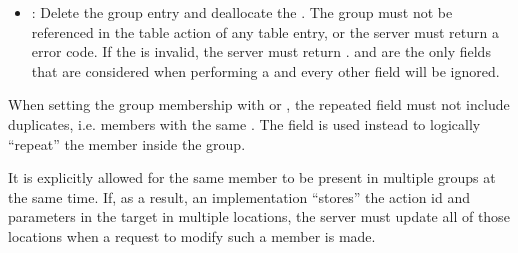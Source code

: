 \documentclass[11pt]{article}
\begin{document}
{\begin{itemize}[noitemsep,topsep=\mdcompacttopsep]
\item{}: Delete the group entry and deallocate the . The group must
not be referenced in the table action of any table entry, or the server must
return a  error code. If the  is invalid, the
server must return .  and  are the
only fields that are considered when performing a  and every other
field will be ignored.%
\end{itemize}%

\noindent{}When setting the group membership with  or , the 
repeated field must not include duplicates, i.e. members with the same
. The  field is used instead to logically \textquotedblleft{}repeat\textquotedblright{} the member
inside the group.%

It is explicitly allowed for the same member to be present in multiple groups at
the same time. If, as a result, an implementation \textquotedblleft{}stores\textquotedblright{} the action id and
parameters in the target in multiple locations, the server must update all of
those locations when a request to modify such a member is made.%

}
\end{document}
